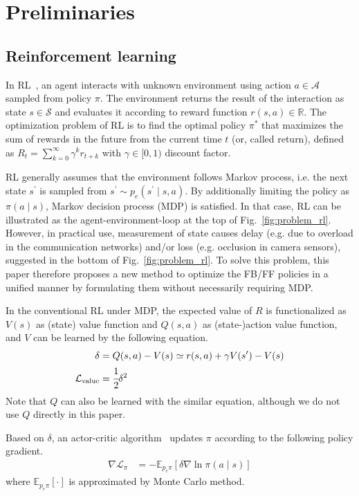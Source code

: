 \documentclass{bmcart}
\begin{document}
\section{Preliminaries}

\subsection{Reinforcement learning}

In RL~\cite{sutton2018reinforcement}, an agent interacts with unknown environment using action $a \in \mathcal{A}$ sampled from policy $\pi$.
The environment returns the result of the interaction as state $s \in \mathcal{S}$ and evaluates it according to reward function $r(s, a) \in \mathbb{R}$.
The optimization problem of RL is to find the optimal policy $\pi^*$ that maximizes the sum of rewards in the future from the current time $t$ (or, called return), defined as $R_t = \sum_{k=0}^\infty \gamma^k r_{t+k}$ with $\gamma \in [0, 1)$ discount factor.

RL generally assumes that the environment follows Markov process, i.e. the next state $s^\prime$ is sampled from $s^\prime \sim p_e(s^\prime \mid s, a)$.
By additionally limiting the policy as $\pi(a \mid s)$, Markov decision process (MDP) is satisfied.
In that case, RL can be illustrated as the agent-environment-loop at the top of Fig.~\ref{fig:problem_rl}.
However, in practical use, measurement of state causes delay (e.g. due to overload in the communication networks) and/or loss (e.g. occlusion in camera sensors), suggested in the bottom of Fig.~\ref{fig:problem_rl}.
To solve this problem, this paper therefore proposes a new method to optimize the FB/FF policies in a unified manner by formulating them without necessarily requiring MDP.

In the conventional RL under MDP, the expected value of $R$ is functionalized as $V(s)$ as (state) value function and $Q(s, a)$ as (state-)action value function, and $V$ can be learned by the following equation.
\begin{align}
    \delta &= Q(s,a) - V(s) \simeq r(s, a) + \gamma V(s^\prime) - V(s)
    \label{eq:td_err} \\
    \mathcal{L}_\mathrm{value} &= \cfrac{1}{2}\delta^2
    \label{eq:loss_value}
\end{align}
Note that $Q$ can also be learned with the similar equation, although we do not use $Q$ directly in this paper.

Based on $\delta$, an actor-critic algorithm~\cite{konda2000actor} updates $\pi$ according to the following policy gradient.
\begin{align}
    \nabla \mathcal{L}_\pi &= - \mathbb{E}_{p_e \pi} [\delta \nabla \ln \pi(a \mid s)]
    \label{eq:grad_ac}
\end{align}
where $\mathbb{E}_{p_e \pi} [\cdot]$ is approximated by Monte Carlo method.
\end{document}
